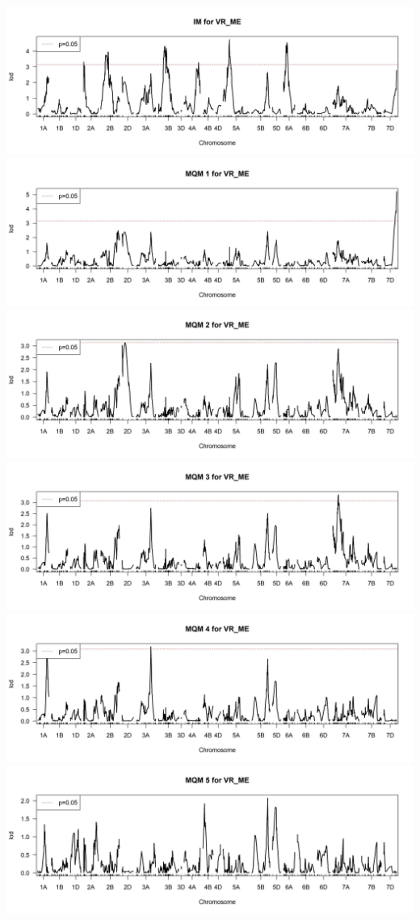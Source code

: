 \documentclass[
]{article}
\begin{document}
\includegraphics{Scan_IM_VR_ME.jpg}
\includegraphics{Scan_MQM1_VR_ME.jpg}
\includegraphics{Scan_MQM2_VR_ME.jpg}
\includegraphics{Scan_MQM3_VR_ME.jpg}
\includegraphics{Scan_MQM4_VR_ME.jpg}
\includegraphics{Scan_MQM5_VR_ME.jpg} \pagebreak
\end{document}
